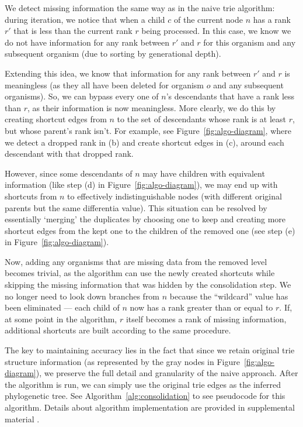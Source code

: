 We detect missing information the same way as in the naive trie algorithm: during iteration, we notice that when a child $c$ of the current node $n$ has a rank $r'$ that is less than the current rank $r$ being processed.
In this case, we know we do not have information for any rank between $r'$ and $r$ for this organism and any subsequent organism (due to sorting by generational depth).

Extending this idea, we know that information for any rank between $r'$ and $r$ is meaningless (as they all have been deleted for organism $o$ and any subsequent organisms). 
So, we can bypass every one of $n$'s descendants that have a rank less than $r$, as their information is now meaningless.
More clearly, we do this by creating shortcut edges from $n$ to the set of descendants whose rank is at least $r$, but whose parent's rank isn't. For example, see Figure~\ref{fig:algo-diagram}, where we detect a dropped rank in (b) and create shortcut edges in (c), around each descendant with that dropped rank.

However, since some descendants of $n$ may have children with equivalent information (like step (d) in Figure~\ref{fig:algo-diagram}), we may end up with shortcuts from $n$ to effectively indistinguishable nodes (with different original parents but the same differentia value).
This situation can be resolved by essentially `merging' the duplicates by choosing one to keep and creating more shortcut edges from the kept one to the children of the removed one (see step (e) in Figure~\ref{fig:algo-diagram}).

Now, adding any organisms that are missing data from the removed level becomes trivial, as the algorithm can use the newly created shortcuts while skipping the missing information that was hidden by the consolidation step.
We no longer need to look down branches from $n$ because the ``wildcard'' value has been eliminated --- each child of $n$ now has a rank greater than or equal to $r$.
If, at some point in the algorithm, $r$ itself becomes a rank of missing information, additional shortcuts are built according to the same procedure.



The key to maintaining accuracy lies in the fact that since we retain original trie structure information (as represented by the gray nodes in Figure~\ref{fig:algo-diagram}), we preserve the full detail and granularity of the naive approach.
After the algorithm is run, we can simply use the original trie edges as the inferred phylogenetic tree.
See Algorithm~\ref{alg:consolidation} to see pseudocode for this algorithm.
Details about algorithm implementation are provided in supplemental material \citep{supplemental}.

